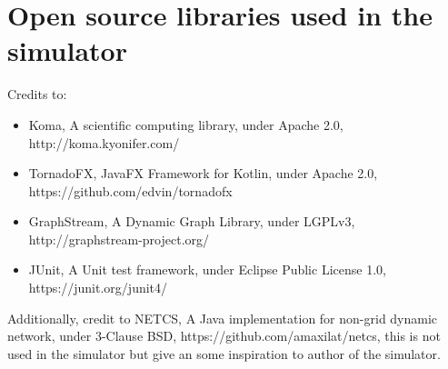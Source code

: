 \section{Open source libraries used in the simulator}
Credits to:
\begin{itemize}
  \item Koma, A scientific computing library, under Apache 2.0, http://koma.kyonifer.com/
  \item TornadoFX, JavaFX Framework for Kotlin, under Apache 2.0, https://github.com/edvin/tornadofx
  \item GraphStream, A Dynamic Graph Library, under LGPLv3, http://graphstream-project.org/
  \item JUnit, A Unit test framework, under Eclipse Public License 1.0, https://junit.org/junit4/
\end{itemize}
Additionally, credit to NETCS, A Java implementation for non-grid dynamic network, under 3-Clause BSD, https://github.com/amaxilat/netcs,
this is not used in the simulator but give an some inspiration to author of the simulator.
